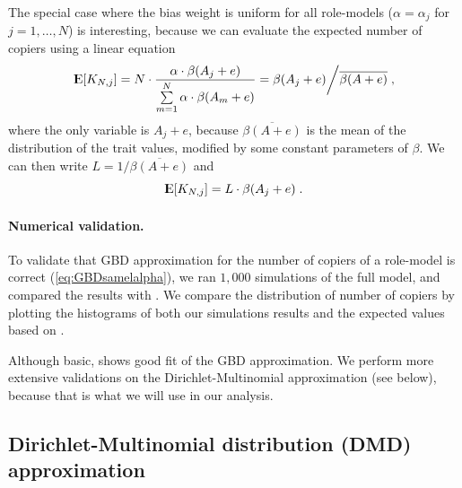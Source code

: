 \documentclass[12pt]{extarticle}
\DeclareMathOperator*{\E}{{\rm I\kern-.3em E}}
\begin{document}
The special case where the bias weight is uniform for all role-models ($\alpha = \alpha_j$ for $j=1,\ldots, N$) is interesting, because we can evaluate the expected number of copiers using a linear equation
\begin{equation}\label{eq:GBDsamelalpha}
\E[K_{N,j}]= N\cdot\frac{\alpha\cdot\beta(A_j+e)}{\sum\limits_{m=1}^{N}\alpha\cdot\beta(A_m+e)} =\beta(A_j+e) \bigg/ \overline{\beta(A+e)} \;,
\end{equation}
where the only variable is $A_j+e$, because $\overline{\beta(A+e)}$ is the mean of the distribution of the trait values, modified by some constant parameters of $\beta$.
We can then write $L = 1/\overline{\beta(A+e)}$ and
\begin{equation}\label{eq:linearEq}
\E[K_{N,j}] = L\cdot \beta(A_j+e) \;.
\end{equation}

\paragraph{Numerical validation.}
To validate that GBD approximation for the number of copiers of a role-model is correct (\cref{eq:GBDsamelalpha}), %
we ran $1,000$ simulations of the full model, and compared the results with .
We compare the distribution of number of copiers by plotting the histograms of both our simulations results and the expected values based on .

Although basic,  shows good fit of the GBD approximation.
We perform more extensive validations on the Dirichlet-Multinomial approximation (see below), because that is what we will use in our analysis.

\subsection*{Dirichlet-Multinomial distribution (DMD) approximation}
\end{document}
